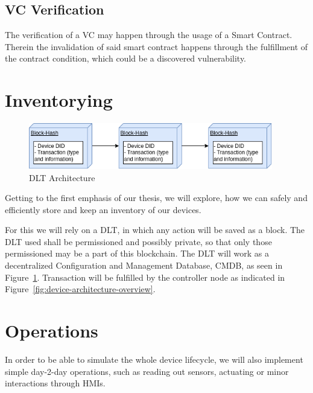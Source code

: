 \subsection{VC Verification} %
\label{sub:VC Verification}
The verification of a VC may happen through the usage of a Smart Contract. Therein the invalidation of
said smart contract happens through the fulfillment of the contract condition, which could be a discovered
vulnerability.



\section{Inventorying} %
\label{sec:Inventorying}

\begin{figure}
	\begin{center}
		\includegraphics[width=0.95\textwidth]{figures/dlt-architecture.png}
	\end{center}
	\caption{DLT Architecture}
	\label{fig:dlt-architecture}
\end{figure}

Getting to the first emphasis of our thesis, we will explore, how we can safely and efficiently store and keep an
inventory of our devices.

For this we will rely on a DLT, in which any action will be saved as a block. The DLT used shall be permissioned and
possibly private, so that only those permissioned may be a part of this blockchain.
The DLT will work as a decentralized Configuration and Management Database, CMDB, as seen in
Figure~\ref{fig:dlt-architecture}. Transaction will be fulfilled by the controller node as indicated in
Figure~\ref{fig:device-architecture-overview}.



\section{Operations} %
\label{sec:Operations}

In order to be able to simulate the whole device lifecycle, we will also implement simple day-2-day operations, such as
reading out sensors, actuating or minor interactions through HMIs.

